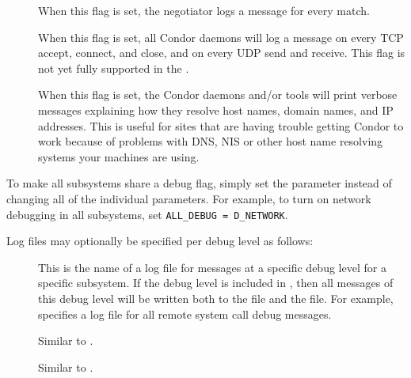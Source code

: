 \begin{description}
\begin{description}
\item[] \label{dflag:match}
  When this flag is
  set, the negotiator logs a message for every match.

\item[] \label{dflag:network}
  When this flag is set,
  all Condor daemons will log a message on every TCP accept, connect,
  and close, and on every UDP send and receive.  This flag is not
  yet fully supported in the .

\item[] \label{dflag:hostname}
  When this flag is set, the Condor daemons and/or tools will print
  verbose messages explaining how they resolve host names, domain
  names, and IP addresses.
  This is useful for sites that are having trouble getting Condor to
  work because of problems with DNS, NIS or other host name resolving
  systems your machines are using.

\end{description}

\item[\Macro{ALL\_DEBUG}] \label{param:AllDebug} To make all subsystems
  share a debug flag, simply set the parameter 
  instead of changing all of the individual parameters.  For example,
  to turn on network debugging in all subsystems, set
  \verb$ALL_DEBUG = D_NETWORK$.

\end{description}

Log files may optionally be specified per debug level as follows:
\begin{description}

\item[] \label{param:SubsysLevelLog} This is
  the name of a log file for messages at a specific debug level for a
  specific subsystem.  If the debug level is included in
  , then all messages of this debug level will be
  written both to the  file and the
   file.  For example,
   specifies a log file for all remote
  system call debug messages.

\item[] \label{param:MaxSubsysLevelLog}
  Similar to .

\item[]
  \label{param:TruncSubsysLevelLogOnOpen} Similar to
  .

\end{description}

